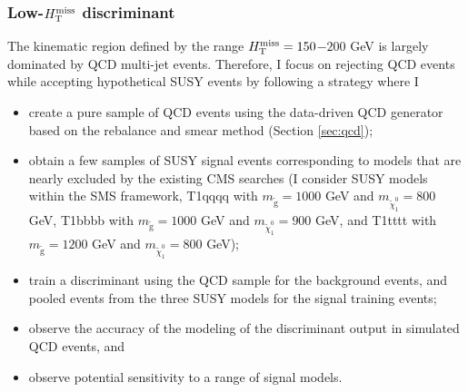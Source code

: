 \subsubsection{Low-$H_{\text{T}}^{\rm miss}$ discriminant}
The kinematic region defined by the range $H_{\text{T}}^{\rm miss}=150$$-$$200$ GeV is largely dominated by QCD multi-jet events. Therefore, I focus on rejecting QCD events while accepting hypothetical SUSY events by following a strategy where I
\begin{itemize}
\item create a pure sample of QCD events using the data-driven QCD generator based on the rebalance and smear method (Section \ref{sec:qcd});
\item obtain a few samples of SUSY signal events corresponding to models that are nearly excluded by the existing CMS searches (I consider SUSY models within the SMS framework, T1qqqq with $m_{\tilde{\text{g}}}=1000$ GeV and $m_{\tilde{\chi}^{0}_{1}}=800$ GeV,  T1bbbb with $m_{\tilde{\text{g}}}=1000$ GeV and $m_{\tilde{\chi}^{0}_{1}}=900$ GeV, and T1tttt with $m_{\tilde{\text{g}}}=1200$ GeV and $m_{\tilde{\chi}^{0}_{1}}=800$ GeV);
\item train a discriminant using the QCD sample for the background events, and pooled events from the three SUSY models for the signal training events;
\item observe the accuracy of the modeling of the discriminant output in simulated QCD events, and
\item observe potential sensitivity to a range of signal models.
\end{itemize}

